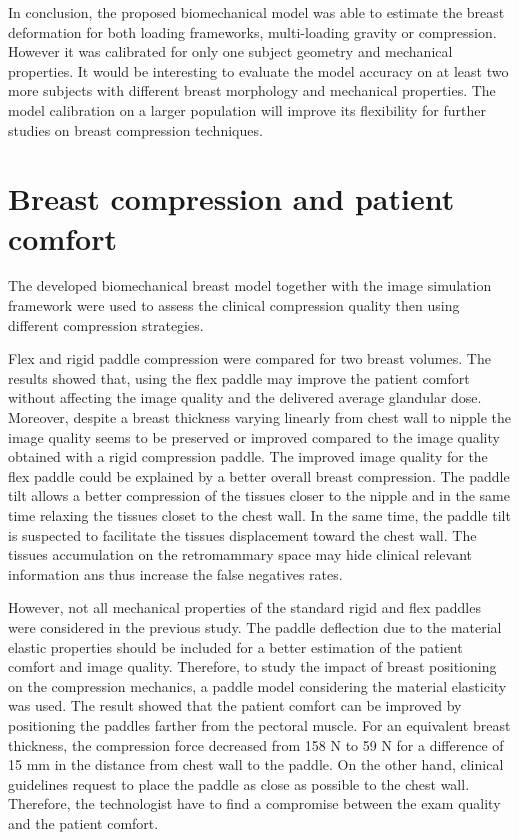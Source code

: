 In conclusion, the proposed biomechanical model was able to estimate the breast deformation for both loading frameworks, multi-loading gravity or compression. However it was calibrated for only one subject geometry and mechanical properties. It would be interesting to evaluate the model accuracy on at least two more subjects with different breast morphology and mechanical properties. The model calibration on a larger population will improve its flexibility for further studies on breast compression techniques.   

\section{Breast compression and patient comfort}
The developed biomechanical breast model together with the image simulation framework were used to assess the clinical compression quality then using different compression strategies.

Flex and rigid paddle compression were compared for two breast volumes. The results showed that, using the flex paddle may improve the patient comfort without affecting the image quality and the delivered average glandular dose. Moreover, despite a breast thickness varying linearly from chest wall to nipple the image quality seems to be preserved or improved compared to the image quality obtained with a rigid compression paddle. The improved image quality for the flex paddle could be explained by a better overall breast compression. The paddle tilt allows a better compression of the tissues closer to the nipple and in the same time relaxing the tissues closet to the chest wall. In the same time, the paddle tilt is suspected to facilitate the tissues displacement toward the chest wall.  The tissues accumulation on the retromammary space may hide clinical relevant information ans thus increase the false negatives rates. 

However, not all mechanical properties of the standard rigid and flex paddles were considered in the previous study. The paddle deflection due to the material elastic properties should be included for a better estimation of the patient comfort and image quality. Therefore, to study the impact of breast positioning on the compression mechanics, a paddle model considering the material elasticity was used. The result showed that the patient comfort can be improved by positioning the paddles farther from the pectoral muscle. For an equivalent breast thickness, the compression force decreased from 158 N to 59 N for a difference of 15 mm in the distance from chest wall to the paddle. On the other hand, clinical guidelines request to place the paddle as close as possible to the chest wall. Therefore, the technologist have to find a compromise between the exam quality and the patient comfort. 

